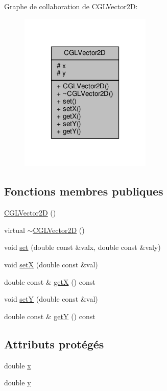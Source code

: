 Graphe de collaboration de C\-G\-L\-Vector2\-D\-:\nopagebreak
\begin{figure}[H]
\begin{center}
\leavevmode
\includegraphics[width=178pt]{db/d79/class_c_g_l_vector2_d__coll__graph}
\end{center}
\end{figure}
\subsection*{Fonctions membres publiques}
\begin{DoxyCompactItemize}
\item 
\hyperlink{class_c_g_l_vector2_d_a777d33ddc05a95c0c4a56672d50a3138}{C\-G\-L\-Vector2\-D} ()
\item 
virtual \hyperlink{class_c_g_l_vector2_d_a93cf12a834078803bee4f19d42e09a02}{$\sim$\-C\-G\-L\-Vector2\-D} ()
\item 
void \hyperlink{class_c_g_l_vector2_d_a37b79a5ca7b3445df956e177f7c436fc}{set} (double const \&valx, double const \&valy)
\item 
void \hyperlink{class_c_g_l_vector2_d_a22db1a511fae81b0d7a6766b6490dd8c}{set\-X} (double const \&val)
\item 
double const \& \hyperlink{class_c_g_l_vector2_d_a5f25e872259c579251336dfe0faf8701}{get\-X} () const 
\item 
void \hyperlink{class_c_g_l_vector2_d_a4c89a21e28a86848c6b023ad60baef4c}{set\-Y} (double const \&val)
\item 
double const \& \hyperlink{class_c_g_l_vector2_d_ad279638b74a0caac60632b169136688c}{get\-Y} () const 
\end{DoxyCompactItemize}
\subsection*{Attributs protégés}
\begin{DoxyCompactItemize}
\item 
double \hyperlink{class_c_g_l_vector2_d_adca68a6660d264b4fcb312c881c57861}{x}
\item 
double \hyperlink{class_c_g_l_vector2_d_a36a88cf9827f308a125e51164c73e21f}{y}
\end{DoxyCompactItemize}


